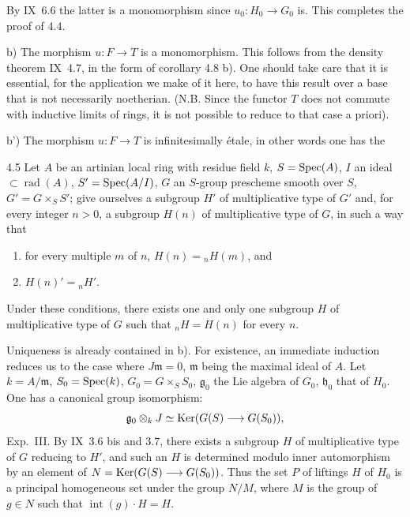 By IX~6.6 the latter is a monomorphism since $u_0:H_0\to G_0$ is. This completes the proof of 4.4.

b) The morphism $u:F\to T$ is a monomorphism. This follows from the density theorem IX~4.7, in the form of corollary 4.8 b). One should take care that it is essential, for the application we make of it here, to have this result over a base that is not necessarily noetherian. (N.B. Since the functor $T$ does not commute with inductive limits of rings, it is not possible to reduce to that case a priori).

b') The morphism $u:F\to T$ is infinitesimally étale, in other words one has the
\begin{lemma}{4.5}\label{XI.4.5}
Let $A$ be an artinian local ring with residue field $k$, $S=\operatorname{Spec}(A)$, $I$ an ideal $\subset\operatorname{rad}(A)$, $S'=\operatorname{Spec}(A/I)$, $G$ an $S$-group prescheme smooth over $S$, $G'=G\times_S S'$; give ourselves a subgroup $H'$ of multiplicative type of $G'$ and, for every integer $n>0$, a subgroup $H(n)$ of multiplicative type of $G$, in such a way that
\begin{enumerate}[label=\arabic*$^\circ$)]
\item for every multiple $m$ of $n$, $H(n)={}_nH(m)$, and
\item $H(n)'={}_nH'$.
\end{enumerate}
Under these conditions, there exists one and only one subgroup $H$ of multiplicative type of $G$ such that ${}_nH=H(n)$ for every $n$.
\end{lemma}
Uniqueness is already contained in b). For existence, an immediate induction reduces us to the case where $J\mathfrak m=0$, $\mathfrak m$ being the maximal ideal of $A$. Let $k=A/\mathfrak m$, $S_0=\operatorname{Spec}(k)$, $G_0=G\times_S S_0$, $\mathfrak g_0$ the Lie algebra of $G_0$, $\mathfrak h_0$ that of $H_0$. One has a canonical group isomorphism:
\[
\mathfrak g_0\otimes_k J\simeq\operatorname{Ker}(G(S)\longrightarrow G(S_0)),
\]
\cf Exp.~III. By IX~3.6 bis and 3.7, there exists a subgroup $H$ of multiplicative type of $G$ reducing to $H'$, and such an $H$ is determined modulo inner automorphism by an element of $N=\operatorname{Ker}(G(S)\longrightarrow G(S_0))$. Thus the set $P$ of liftings $H$ of $H_0$ is a principal homogeneous set under the group $N/M$, where $M$ is the group of $g\in N$ such that $\operatorname{int}(g)\cdot H=H$.


